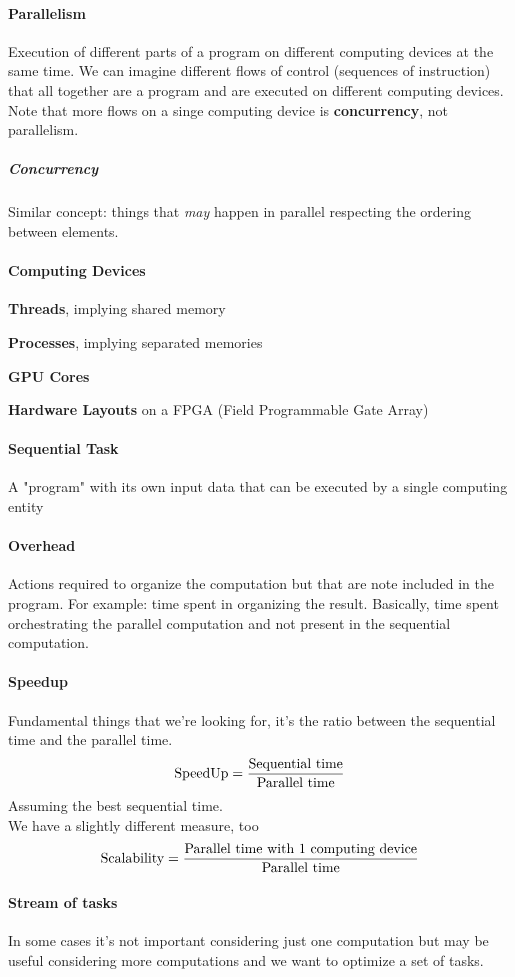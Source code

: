 \documentclass[10pt]{report}
\begin{document}
\paragraph{Parallelism} Execution of different parts of a program on different computing devices at the same time. We can imagine different flows of control (sequences of instruction) that all together are a program and are executed on different computing devices. Note that more flows on a singe computing device is \textbf{concurrency}, not parallelism.
\subparagraph{Concurrency} Similar concept: things that \textit{may} happen in parallel respecting the ordering between elements.
\paragraph{Computing Devices}\begin{list}{}{}
	\item \textbf{Threads}, implying shared memory
	\item \textbf{Processes}, implying separated memories
	\item \textbf{GPU Cores}
	\item \textbf{Hardware Layouts} on a FPGA (Field Programmable Gate Array) 
\end{list}
\paragraph{Sequential Task} A "program" with its own input data that can be executed by a single computing entity
\paragraph{Overhead} Actions required to organize the computation but that are note included in the program. For example: time spent in organizing the result. Basically, time spent orchestrating the parallel computation and not present in the sequential computation.
\paragraph{Speedup} Fundamental things that we're looking for, it's the ratio between the sequential time and the parallel time.$$\hbox{SpeedUp} = \frac{\hbox{Sequential time}}{\hbox{Parallel time}}$$
Assuming the best sequential time.\\
We have a slightly different measure, too
$$\hbox{Scalability}=\frac{\hbox{Parallel time with 1 computing device}}{\hbox{Parallel time}}$$
\paragraph{Stream of tasks} In some cases it's not important considering just one computation but may be useful considering more computations and we want to optimize a set of tasks.
\end{document}
